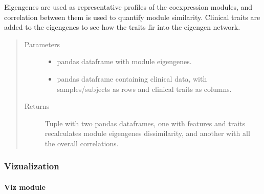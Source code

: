 \documentclass[letterpaper,10pt,english]{sphinxmanual}
\begin{document}
\begin{fulllineitems}
\label{\detokenize{_autosummary/analytics_core.analytics:analytics_core.analytics.wgcnaAnalysis.get_EigengenesTrait_correlation}}
Eigengenes are used as representative profiles of the co\sphinxhyphen{}expression modules, and correlation between them is used to quantify module similarity.
Clinical traits are added to the eigengenes to see how the traits fir into the eigengen network.
\begin{quote}\begin{description}
\item[{Parameters}] \leavevmode\begin{itemize}
\item {} 
 \textendash{} pandas dataframe with module eigengenes.

\item {} 
 \textendash{} pandas dataframe containing clinical data, with samples/subjects as rows and clinical traits as columns.

\end{itemize}

\item[{Returns}] \leavevmode
Tuple with two pandas dataframes, one with features and traits recalculates module eigengenes dissimilarity, and another with all the overall correlations.

\end{description}\end{quote}

\end{fulllineitems}



\subsubsection{Vizualization}
\label{\detokenize{_autosummary/analytics_core.viz:vizualization}}\label{\detokenize{_autosummary/analytics_core.viz::doc}}

\paragraph{Viz module}
\label{\detokenize{_autosummary/analytics_core.viz:module-analytics_core.viz.viz}}\label{\detokenize{_autosummary/analytics_core.viz:viz-module}}
\end{document}
